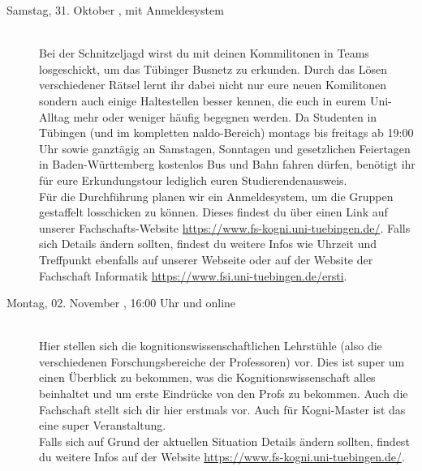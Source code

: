 \begin{description}

\ifkogwiss
\item[Samstag, 31. Oktober \YEAR, mit Anmeldesystem]\ \\
    Bei der Schnitzeljagd wirst du mit deinen Kommilitonen in Teams losgeschickt, um das Tübinger Busnetz zu erkunden. Durch das Lösen verschiedener Rätsel lernt ihr dabei nicht nur eure neuen Komilitonen sondern auch einige Haltestellen besser kennen, die euch in eurem Uni-Alltag mehr oder weniger häufig begegnen werden. Da Studenten in Tübingen (und im kompletten naldo-Bereich) montags bis freitags ab 19:00 Uhr sowie ganztägig an Samstagen, Sonntagen und gesetzlichen Feiertagen in Baden-Württemberg kostenlos Bus und Bahn fahren dürfen, benötigt ihr für eure Erkundungstour lediglich euren Studierendenausweis.\\
    Für die Durchführung planen wir ein Anmeldesystem, um die Gruppen gestaffelt losschicken zu können. Dieses findest du über einen Link auf unserer Fachschafts-Website \url{https://www.fs-kogni.uni-tuebingen.de/}.
    Falls sich Details ändern sollten, findest du weitere Infos wie Uhrzeit und Treffpunkt ebenfalls auf unserer Webseite oder auf der Website der Fachschaft Informatik \url{https://www.fsi.uni-tuebingen.de/ersti}.\\
\fi


\ifkogwiss
\item[Montag, 02. November \YEAR, 16:00 Uhr und online]\ \\
    Hier stellen sich die kognitionswissenschaftlichen Lehrstühle (also die verschiedenen Forschungsbereiche der Professoren) vor. Dies ist super um einen Überblick zu bekommen, was die Kognitionswissenschaft alles beinhaltet und um erste Eindrücke von den Profs zu bekommen. Auch die Fachschaft stellt sich dir hier erstmals vor. %
    Auch für Kogni-Master ist das eine super Veranstaltung. \\
    Falls sich auf Grund der aktuellen Situation Details ändern sollten, findest du weitere Infos auf der Website \url{https://www.fs-kogni.uni-tuebingen.de/}.
    
\fi


\end{description}
